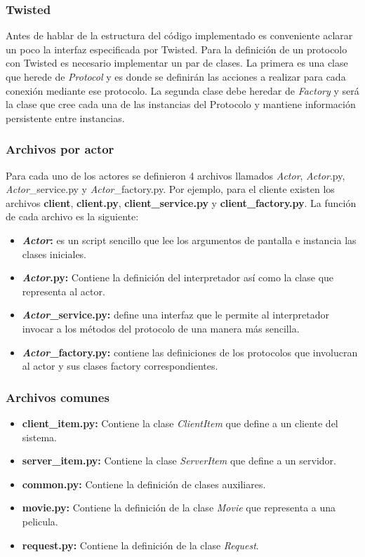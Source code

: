 \documentclass{article}
\begin{document}
\subsubsection*{Twisted}
Antes de hablar de la estructura del código implementado es conveniente aclarar un poco la interfaz especificada por Twisted.
Para la definición de un protocolo con Twisted es necesario implementar un par de clases. La primera es una clase que herede de \emph{Protocol} y es
donde se definirán las acciones a realizar para cada conexión mediante ese protocolo. La segunda clase debe heredar de \emph{Factory} y será la clase
que cree cada una de las instancias del Protocolo y mantiene información persistente entre instancias.

\subsubsection*{Archivos por actor}
Para cada uno de los actores se definieron 4 archivos llamados \emph{Actor}, \emph{Actor}.py, \emph{Actor}\_service.py y \emph{Actor}\_factory.py. 
Por ejemplo, para el cliente existen los archivos \textbf{client}, \textbf{client.py}, \textbf{client\_service.py} y \textbf{client\_factory.py}.
La función de cada archivo es la siguiente:

\begin{itemize} 
    \item \textbf{\emph{Actor}:} es un script sencillo que lee los argumentos de pantalla e instancia las clases iniciales.
    \item \textbf{\emph{Actor}.py:} Contiene la definición del interpretador así como la clase que representa al actor.
    \item \textbf{\emph{Actor}\_service.py:} define una interfaz que le permite al interpretador invocar a los métodos del protocolo de una manera más sencilla.
    \item \textbf{\emph{Actor}\_factory.py:} contiene las definiciones de los protocolos que involucran al actor y sus clases factory correspondientes.
\end{itemize}

\subsubsection*{Archivos comunes}
\begin{itemize}
    \item \textbf{client\_item.py:} Contiene la clase \emph{ClientItem} que define a un cliente del sistema.
    \item \textbf{server\_item.py:} Contiene la clase \emph{ServerItem} que define a un servidor.
    \item \textbf{common.py:} Contiene la definición de clases auxiliares.
    \item \textbf{movie.py:} Contiene la definición de la clase \emph{Movie} que representa a una pelicula.
    \item \textbf{request.py:} Contiene la definición de la clase \emph{Request}.
\end{itemize}
\end{document}
